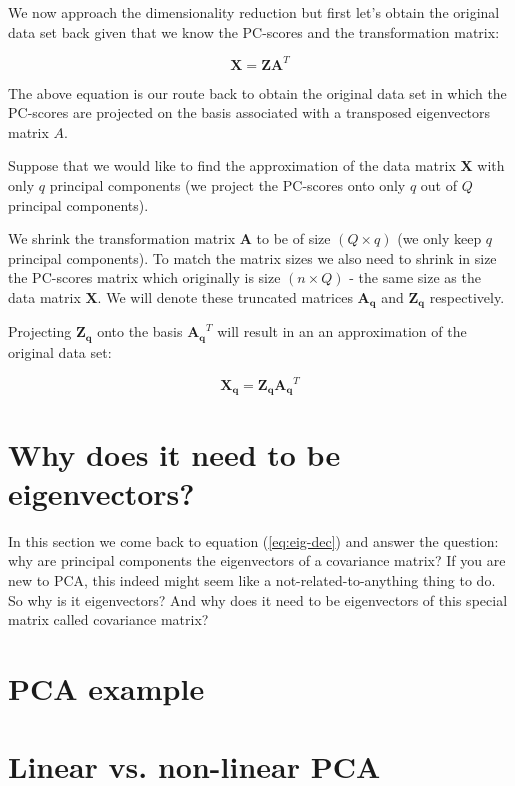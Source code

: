 \documentclass[10pt,twocolumn]{article}
\begin{document}
We now approach the dimensionality reduction but first let's obtain the original data set back given that we know the PC-scores and the transformation matrix:

\begin{equation}
\bm{X} = \bm{Z} \bm{A}^T
\end{equation}

The above equation is our route back to obtain the original data set in which the PC-scores are projected on the basis associated with a transposed eigenvectors matrix $A$.

Suppose that we would like to find the approximation of the data matrix $\bm{X}$ with only $q$ principal components (we project the PC-scores onto only $q$ out of $Q$ principal components).

We shrink the transformation matrix $\bm{A}$ to be of size $(Q \times q)$ (we only keep $q$ principal components). To match the matrix sizes we also need to shrink in size the PC-scores matrix which originally is size $(n \times Q)$ - the same size as the data matrix $\bm{X}$. We will denote these truncated matrices $\bm{A_q}$ and $\bm{Z_q}$ respectively.

Projecting $\bm{Z_q}$ onto the basis $\bm{A_q}^T$ will result in an an approximation of the original data set:

\begin{equation}
\bm{X_q} = \bm{Z_q} \bm{A_q}^T
\end{equation}

\section{Why does it need to be eigenvectors?}

In this section we come back to equation (\ref{eq:eig-dec}) and answer the question: why are principal components the eigenvectors of a covariance matrix? If you are new to PCA, this indeed might seem like a not-related-to-anything thing to do. So why is it eigenvectors? And why does it need to be eigenvectors of this special matrix called covariance matrix?

\section{PCA example}

\section{Linear vs. non-linear PCA}
\end{document}
